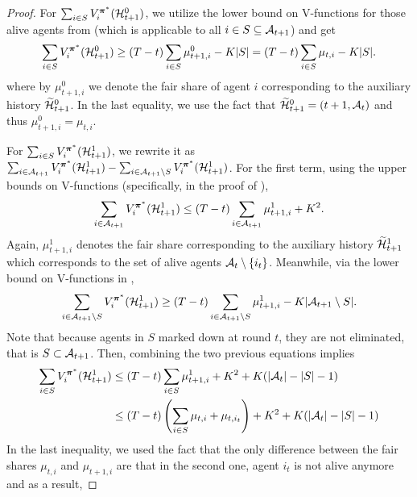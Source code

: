 \begin{proof}
For $\sum_{i\in S} V_i^{\bm \pi^\ast}(\mathcal{H}_{t+1}^0)$, we utilize the lower bound on V-functions for those alive agents from  (which is applicable to all $i\in S\subseteq \mathcal{A}_{t+1}$) and get
\begin{equation}\label{eq:lower_bound_sum_values}
    \sum_{i\in S} V_i^{{\bm \pi}^{\ast}}(\mathcal{H}_{t+1}^0) \geq (T-t)\sum_{i\in S}\mu_{t+1,i}^0 - K|S| = (T-t)\sum_{i\in S}\mu_{t,i} - K|S|.
\end{equation}
where by $\mu_{t+1,i}^0$ we denote the fair share of agent $i$ corresponding to the auxiliary history $\widetilde{\mathcal{H}}_{t+1}^0$. In the last equality, we use the fact that $\widetilde {\mathcal{H}}_{t+1}^0=(t+1,\mathcal{A}_t)$ and thus $\mu_{t+1,i}^0=\mu_{t,i}$.

For $\sum_{i\in S}V_i^{\bm \pi^\ast}(\mathcal{H}_{t+1}^1)$, we rewrite it as $\sum_{i\in \mathcal{A}_{t+1}}V_i^{\bm \pi^\ast}(\mathcal{H}_{t+1}^1)-\sum_{i\in \mathcal{A}_{t+1}\setminus S}V_i^{\bm \pi^\ast}(\mathcal{H}_{t+1}^1)$. For the first term, using the upper bounds on V-functions (specifically,  in the proof of ),
\begin{equation*}
    \sum_{i\in \mathcal{A}_{t+1}} V_i^{{\bm \pi}^{\ast}}(\mathcal{H}_{t+1}^1)  \leq (T-t)\sum_{i\in\mathcal{A}_{t+1}}\mu_{t+1,i}^1 + K^2.
\end{equation*}
Again, $\mu_{t+1,i}^1$ denotes the fair share corresponding to the auxiliary history $\widetilde{\mathcal{H}}_{t+1}^1$ which corresponds to the set of alive agents $\mathcal{A}_t\setminus\{i_t\}$. Meanwhile, via the lower bound on V-functions in ,
\begin{equation*}
     \sum_{i\in\mathcal{A}_{t+1}\setminus S} V_i^{{\bm \pi}^{\ast}}(\mathcal{H}_{t+1}^1) \geq (T-t)\sum_{i\in\mathcal{A}_{t+1}\setminus S}\mu_{t+1,i}^1 -K|\mathcal{A}_{t+1}\setminus S|.
\end{equation*}
Note that because agents in $S$ marked down at round $t$, they are not eliminated, that is $S\subset\mathcal{A}_{t+1}$. Then, combining the two previous equations implies
\begin{align}
    \sum_{i\in S}  V_i^{{\bm \pi}^{\ast}}(\mathcal{H}_{t+1}^1) &\leq (T-t)\sum_{i\in S}\mu_{t+1,i}^1 + K^2 + K(|\mathcal{A}_t|-|S|-1)\notag\\
    &\leq (T-t)\left( \sum_{i\in S}\mu_{t,i} + \mu_{t,i_t} \right) + K^2 + K(|\mathcal{A}_t|-|S|-1)\label{eq:new_upper_bound_sum_S}
\end{align}
In the last inequality, we used the fact that the only difference between the fair shares $\mu_{t,i}$ and $\mu_{t+1,i}$ are that in the second one, agent $i_t$ is not alive anymore and as a result,

\end{proof}
